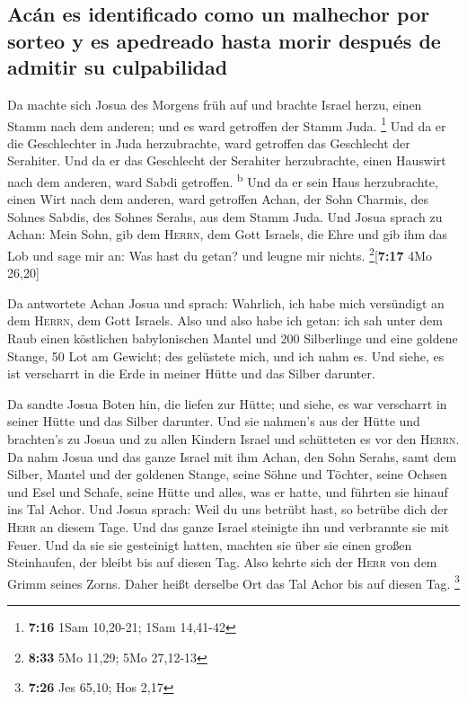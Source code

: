 \hypertarget{acuxe1n-es-identificado-como-un-malhechor-por-sorteo-y-es-apedreado-hasta-morir-despuuxe9s-de-admitir-su-culpabilidad}{%
\subsection{Acán es identificado como un malhechor por sorteo y es
apedreado hasta morir después de admitir su
culpabilidad}\label{acuxe1n-es-identificado-como-un-malhechor-por-sorteo-y-es-apedreado-hasta-morir-despuuxe9s-de-admitir-su-culpabilidad}}

 Da machte sich Josua des Morgens früh auf und brachte
Israel herzu, einen Stamm nach dem anderen; und es ward getroffen der
Stamm Juda. \footnote{\textbf{7:16} 1Sam 10,20-21; 1Sam 14,41-42}
 Und da er die Geschlechter in Juda herzubrachte, ward
getroffen das Geschlecht der Serahiter. Und da er das Geschlecht der
Serahiter herzubrachte, einen Hauswirt nach dem anderen, ward Sabdi
getroffen. \textsuperscript{b}  Und da er sein Haus
herzubrachte, einen Wirt nach dem anderen, ward getroffen Achan, der
Sohn Charmis, des Sohnes Sabdis, des Sohnes Serahs, aus dem Stamm Juda.
 Und Josua sprach zu Achan: Mein Sohn, gib dem
\textsc{Herrn}, dem Gott Israels, die Ehre und gib ihm das Lob und sage
mir an: Was hast du getan? und leugne mir nichts.
\footnote{\textbf{8:33} 5Mo 11,29; 5Mo 27,12-13}{[}\textbf{7:17} 4Mo
26,20{]}

 Da antwortete Achan Josua und sprach: Wahrlich, ich habe
mich versündigt an dem \textsc{Herrn}, dem Gott Israels. Also und also
habe ich getan:  ich sah unter dem Raub einen köstlichen
babylonischen Mantel und 200 Silberlinge und eine goldene Stange, 50 Lot
am Gewicht; des gelüstete mich, und ich nahm es. Und siehe, es ist
verscharrt in die Erde in meiner Hütte und das Silber darunter.

 Da sandte Josua Boten hin, die liefen zur Hütte; und
siehe, es war verscharrt in seiner Hütte und das Silber darunter.
 Und sie nahmen's aus der Hütte und brachten's zu Josua
und zu allen Kindern Israel und schütteten es vor den \textsc{Herrn}.
 Da nahm Josua und das ganze Israel mit ihm Achan, den
Sohn Serahs, samt dem Silber, Mantel und der goldenen Stange, seine
Söhne und Töchter, seine Ochsen und Esel und Schafe, seine Hütte und
alles, was er hatte, und führten sie hinauf ins Tal Achor.
 Und Josua sprach: Weil du uns betrübt hast, so betrübe
dich der \textsc{Herr} an diesem Tage. Und das ganze Israel steinigte
ihn und verbrannte sie mit Feuer. Und da sie sie gesteinigt hatten,
 machten sie über sie einen großen Steinhaufen, der
bleibt bis auf diesen Tag. Also kehrte sich der \textsc{Herr} von dem
Grimm seines Zorns. Daher heißt derselbe Ort das Tal Achor bis auf
diesen Tag. \footnote{\textbf{7:26} Jes 65,10; Hos 2,17}

